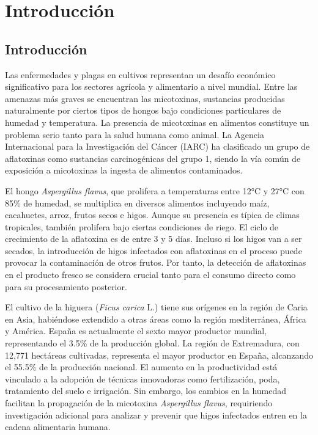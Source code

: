 \chapter{Introducción}
\section{Introducción}
Las enfermedades y plagas en cultivos representan un desafío económico significativo para los sectores agrícola y alimentario a nivel mundial. Entre las amenazas más graves se encuentran las micotoxinas, sustancias producidas naturalmente por ciertos tipos de hongos bajo condiciones particulares de humedad y temperatura. La presencia de micotoxinas en alimentos constituye un problema serio tanto para la salud humana como animal. La Agencia Internacional para la Investigación del Cáncer (IARC) ha clasificado un grupo de aflatoxinas como sustancias carcinogénicas del grupo 1, siendo la vía común de exposición a micotoxinas la ingesta de alimentos contaminados.

El hongo \textit{Aspergillus flavus}, que prolifera a temperaturas entre 12°C y 27°C con 85\% de humedad, se multiplica en diversos alimentos incluyendo maíz, cacahuetes, arroz, frutos secos e higos. Aunque su presencia es típica de climas tropicales, también prolifera bajo ciertas condiciones de riego. El ciclo de crecimiento de la aflatoxina es de entre 3 y 5 días. Incluso si los higos van a ser secados, la introducción de higos infectados con aflatoxinas en el proceso puede provocar la contaminación de otros frutos. Por tanto, la detección de aflatoxinas en el producto fresco se considera crucial tanto para el consumo directo como para su procesamiento posterior.

El cultivo de la higuera (\textit{Ficus carica} L.) tiene sus orígenes en la región de Caria en Asia, habiéndose extendido a otras áreas como la región mediterránea, África y América. España es actualmente el sexto mayor productor mundial, representando el 3.5\% de la producción global. La región de Extremadura, con 12,771 hectáreas cultivadas, representa el mayor productor en España, alcanzando el 55.5\% de la producción nacional. El aumento en la productividad está vinculado a la adopción de técnicas innovadoras como fertilización, poda, tratamiento del suelo e irrigación. Sin embargo, los cambios en la humedad facilitan la propagación de la micotoxina \textit{Aspergillus flavus}, requiriendo investigación adicional para analizar y prevenir que higos infectados entren en la cadena alimentaria humana.

